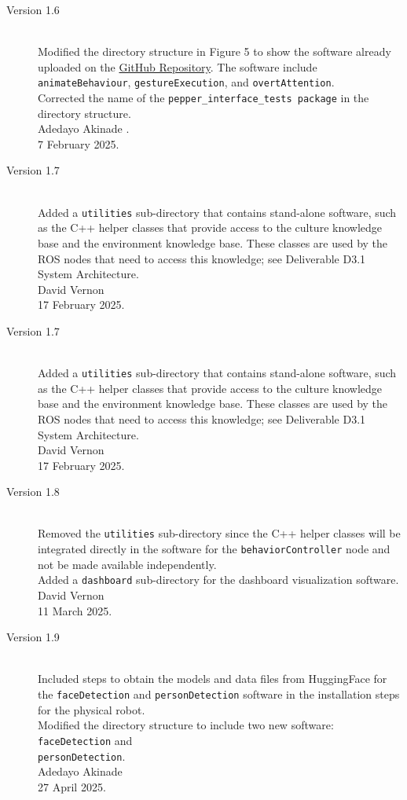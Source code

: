 \documentclass{CSSRforAfrica}
\begin{document}
{\begin{description}
\item [Version 1.6]~\\
Modified the directory structure in Figure 5 to show the software already uploaded on the \href{https://github.com/cssr4africa/cssr4africa} {GitHub Repository}.
The software include \texttt{animateBehaviour}, \texttt{gestureExecution}, and \texttt{overtAttention}.\\
Corrected the name of the \texttt{pepper\_interface\_tests package} in the directory structure.\\
Adedayo Akinade .\\
7 February 2025.

\item [Version 1.7]~\\
Added a {\small \tt utilities} sub-directory that contains stand-alone software, such as the C++ helper classes that provide access to the culture knowledge base and the environment knowledge base. These classes are used by the ROS nodes that need to access this knowledge; see Deliverable D3.1 System Architecture.\\
David Vernon \\       
17 February 2025.

\item [Version 1.7]~\\
Added a {\small \tt utilities} sub-directory that contains stand-alone software, such as the C++ helper classes that provide access to the culture knowledge base and the environment knowledge base. These classes are used by the ROS nodes that need to access this knowledge; see Deliverable D3.1 System Architecture.\\
David Vernon \\       
17 February 2025.

\item [Version 1.8]~\\
Removed the {\small \tt utilities} sub-directory since the C++ helper classes will be integrated directly in the software for the {\small \tt behaviorController} node and not be made available independently.\\
Added a  {\small \tt dashboard} sub-directory for the dashboard visualization software.\\
David Vernon \\       
11 March 2025.

\item [Version 1.9]~\\
Included steps to obtain the models and data files from HuggingFace for the \texttt{faceDetection} and \texttt{personDetection} software in the installation steps for the physical robot.\\
Modified the directory structure to include two new software: \texttt{faceDetection} and \\ \texttt{personDetection}.\\
Adedayo Akinade \\       
27 April 2025.


\end{description}}
\end{document}
